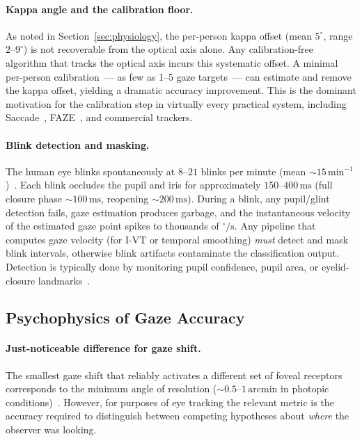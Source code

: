 \documentclass[11pt,a4paper]{article}
\begin{document}
\paragraph{Kappa angle and the calibration floor.}
As noted in Section~\ref{sec:physiology}, the per-person kappa offset (mean $5^\circ$, range $2$--$9^\circ$) is not recoverable from the optical axis alone.
Any calibration-free algorithm that tracks the optical axis incurs this systematic offset.
A minimal per-person calibration~--- as few as 1--5 gaze targets~--- can estimate and remove the kappa offset, yielding a dramatic accuracy improvement.
This is the dominant motivation for the calibration step in virtually every practical system, including Saccade~\cite{papoutsaki2016webgazer}, FAZE~\cite{park2019faze}, and commercial trackers.

\paragraph{Blink detection and masking.}
The human eye blinks spontaneously at $8$--$21$ blinks per minute (mean ${\sim}15\,\text{min}^{-1}$)~\cite{bentivoglio1997analysis}.
Each blink occludes the pupil and iris for approximately $150$--$400\,\text{ms}$ (full closure phase ${\sim}100\,\text{ms}$, reopening ${\sim}200\,\text{ms}$).
During a blink, any pupil/glint detection fails, gaze estimation produces garbage, and the instantaneous velocity of the estimated gaze point spikes to thousands of $^\circ/\text{s}$.
Any pipeline that computes gaze velocity (for I-VT or temporal smoothing) \emph{must} detect and mask blink intervals, otherwise blink artifacts contaminate the classification output.
Detection is typically done by monitoring pupil confidence, pupil area, or eyelid-closure landmarks~\cite{salvucci2000identifying}.

\subsection{Psychophysics of Gaze Accuracy}

\paragraph{Just-noticeable difference for gaze shift.}
The smallest gaze shift that reliably activates a different set of foveal receptors corresponds to the minimum angle of resolution (${\sim}0.5$--$1\,\text{arcmin}$ in photopic conditions)~\cite{curcio1990human}.
However, for purposes of eye tracking the relevant metric is the accuracy required to distinguish between competing hypotheses about \textit{where} the observer was looking.
\end{document}

